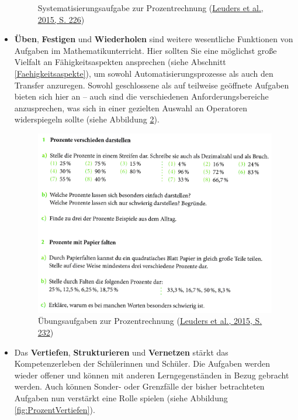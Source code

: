 \documentclass[
]{scrbook}
\theoremstyle{definition}
\theoremstyle{definition}
\theoremstyle{definition}
\theoremstyle{definition}
\theoremstyle{remark}
\begin{document}
\begin{itemize}
\begin{figure}
{    }

    \caption{Systematisierungsaufgabe zur Prozentrechnung (\protect\hyperlink{ref-Barzel2015a}{Leuders et al., 2015, S. 226})}\label{fig:ProzentSammeln}
    \end{figure}
\item
  \textbf{Üben}, \textbf{Festigen} und \textbf{Wiederholen} sind weitere wesentliche Funktionen von Aufgaben im Mathematikunterricht. Hier sollten Sie eine möglichst große Vielfalt an Fähigkeitsaspekten ansprechen (siehe Abschnitt \ref{Faehigkeitsaspekte}), um sowohl Automatisierungsprozesse als auch den Transfer anzuregen. Sowohl geschlossene als auf teilweise geöffnete Aufgaben bieten sich hier an -- auch sind die verschiedenen Anforderungsbereiche anzusprechen, was sich in einer gezielten Auswahl an Operatoren widerspiegeln sollte (siehe Abbildung \ref{fig:ProzentUeben}).

  \begin{figure}

    {\centering \includegraphics[width=0.75\linewidth]{pictures/8-ProzentUeben} 

    }

    \caption{Übungsaufgaben zur Prozentrechnung (\protect\hyperlink{ref-Barzel2015a}{Leuders et al., 2015, S. 232})}\label{fig:ProzentUeben}
    \end{figure}
\item
  Das \textbf{Vertiefen}, \textbf{Strukturieren} und \textbf{Vernetzen} stärkt das Kompetenzerleben der Schülerinnen und Schüler. Die Aufgaben werden wieder offener und können mit anderen Lerngegenständen in Bezug gebracht werden. Auch können Sonder- oder Grenzfälle der bisher betrachteten Aufgaben nun verstärkt eine Rolle spielen (siehe Abbildung \ref{fig:ProzentVertiefen}).

  \begin{figure}


\end{figure}
\end{itemize}
\end{document}

